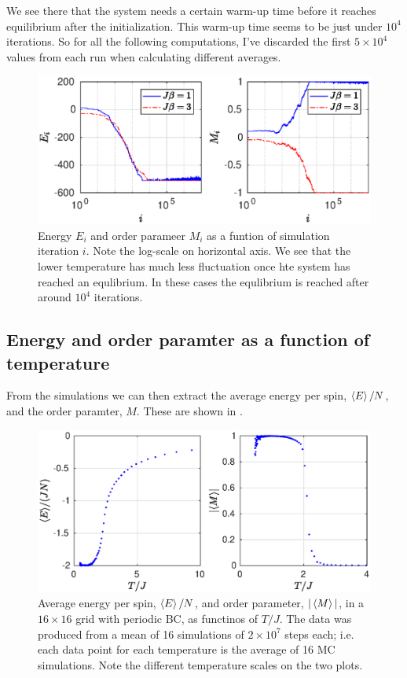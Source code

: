 \documentclass[11pt,letter, swedish, english
]{article}
\begin{document}
We see there that the system needs a certain warm-up time before it
reaches equilibrium after the initialization. This warm-up time seems
to be just under $10^4$ iterations. So for all the following
computations, I've discarded the first $5\times10^4$ values from each
run when calculating different averages. 



\begin{figure}
\centering
\includegraphics[width=1\textwidth]{EM_all-time-steps.eps}
\caption{Energy $E_i$ and order parameer $M_i$ as a funtion of
  simulation iteration $i$. Note the log-scale on horizontal axis. We
  see that the lower temperature has much less fluctuation once hte
  system has reached an equlibrium. In these cases the equlibrium is
  reached after around $10^4$ iterations.} 
\label{fig:EM_all}
\end{figure}


\subsection{Energy and order paramter as a function of temperature}
From the simulations we can then extract the average energy per spin,
$\ev{E}/N$, and the order paramter, $M$. These are shown in
. 

\begin{figure}
\centering
\includegraphics[width=1\textwidth]{EM_L-16_Nsteps-2048_Nmean-16.eps}
\caption{Average energy per spin, $\ev{E}/N$, and order parameter,
  $|\ev{M}|$, in a $16\times16$ grid with periodic BC, as functinos of
  $T/J$. The data was produced from a mean of 16 simulations of
  $2\times10^7$ steps each; i.e. each data point for each temperature
  is the average of 16 MC simulations. Note the different temperature
  scales on the two plots.} 
\label{fig:EM1}
\end{figure}
\end{document}
